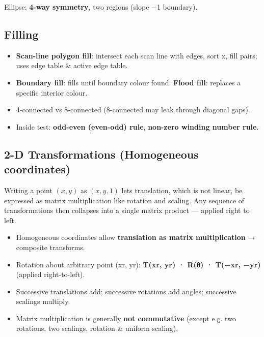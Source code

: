 

Ellipse: \textbf{4-way symmetry}, two regions (slope −1 boundary).

\needspace{95pt}

\hypertarget{p2-03--64-filling}{%
\subsection{Filling}\label{p2-03--64-filling}}

\begin{itemize}
\tightlist
\item
  \textbf{Scan-line polygon fill}: intersect each scan line with edges, sort x, fill pairs; uses edge table \& active edge table.
\item
  \textbf{Boundary fill}: fills until boundary colour found. \textbf{Flood fill}: replaces a specific interior colour.
\item
  4-connected vs 8-connected (8-connected may leak through diagonal gaps).
\item
  Inside test: \textbf{odd-even (even-odd) rule}, \textbf{non-zero winding number rule}.
\end{itemize}

\needspace{125pt}

\hypertarget{p2-03--65-2-d-transformations-homogeneous-coordinates}{%
\subsection{2-D Transformations (Homogeneous coordinates)}\label{p2-03--65-2-d-transformations-homogeneous-coordinates}}

Writing a point \((x, y)\) as \((x, y, 1)\) lets translation, which is not linear, be expressed as matrix
multiplication like rotation and scaling. Any sequence of transformations then collapses into a single
matrix product --- applied right to left.



\begin{itemize}
\tightlist
\item
  Homogeneous coordinates allow \textbf{translation as matrix multiplication} → composite transforms.
\item
  Rotation about arbitrary point (xr, yr): \textbf{T(xr, yr) · R(θ) · T(−xr, −yr)} (applied right-to-left).
\item
  Successive translations add; successive rotations add angles; successive scalings multiply.
\item
  Matrix multiplication is generally \textbf{not commutative} (except e.g. two rotations, two scalings, rotation \& uniform scaling).
\end{itemize}

